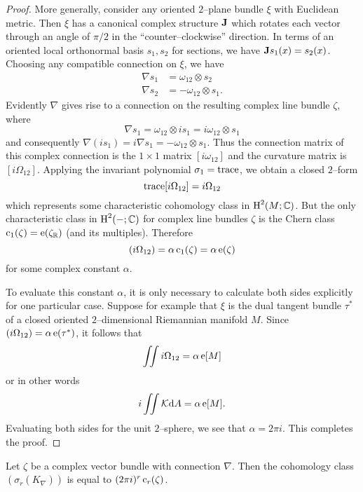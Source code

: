 \documentclass[../main]{subfiles}
\begin{document}
\begin{proof}
More generally, consider any oriented $2$--plane bundle $\xi$ with Euclidean metric. Then $\xi$ has a canonical complex structure $\mathbf{J}$ which rotates each vector through an angle of $\pi/2$ in the ``counter--clockwise'' direction. In terms of an oriented local orthonormal basis $s_1, s_2$ for sections, we have $\mathbf{J} s_1(x) = s_2(x)$. Choosing any compatible connection on $\xi$, we have
\begin{align*}
\nabla s_1 & = \omega_{12} \otimes s_2 \\ \nabla s_2 & = -\omega_{12} \otimes s_1.
\end{align*}
Evidently $\nabla$ gives rise to a connection on the resulting complex line bundle $\zeta$, where \[\nabla s_1 = \omega_{12} \otimes i s_1 = i \omega_{12} \otimes s_1\] and consequently $\nabla(i s_1) = i \nabla s_1 = -\omega_{12} \otimes s_1$. Thus the connection matrix of this complex connection is the $1 \times 1$ matrix $[i \omega_{12}]$ and the curvature matrix is $[i \Omega_{12}]$. Applying the invariant polynomial $\sigma_1 = \operatorname{trace}$, we obtain a closed $2$--form \[\operatorname{trace} [i \Omega_{12}] = i\Omega_{12}\] which represents some characteristic cohomology class in $\operatorname{H}^2(M; \mathbb C)$. But the only characteristic class in $\operatorname{H}^2(-; \mathbb C)$ for complex line bundles $\zeta$ is the Chern class $\operatorname{c}_1(\zeta) = \operatorname{e}(\zeta_{\mathbb R})$ (and its multiples). Therefore \[(i \Omega_{12}) = \alpha \operatorname{c}_1(\zeta) = \alpha \operatorname{e}(\zeta)\] for some complex constant $\alpha$. 

To evaluate this constant $\alpha$, it is only necessary to calculate both sides explicitly for one particular case. Suppose for example that $\xi$ is the dual tangent bundle $\tau^\ast$ of a closed oriented $2$--dimensional Riemannian manifold $M$. Since $(i \Omega_{12}) = \alpha \operatorname{e}(\tau^\ast)$, it follows that \[\iint i \Omega_{12} = \alpha \operatorname{e}[M]\] or in other words \[i \iint \mathcal K \mathrm{d} A = \alpha \operatorname{e}[M].\] Evaluating both sides for the unit $2$--sphere, we see that $\alpha = 2 \pi i$. This completes the proof. 
\end{proof}

\begin{theorem*}
Let $\zeta$ be a complex vector bundle with connection $\nabla$. Then the cohomology class $(\sigma_r(K_\nabla))$ is equal to $(2 \pi i)^r \operatorname{c}_r(\zeta)$. 
\end{theorem*}
\end{document}
